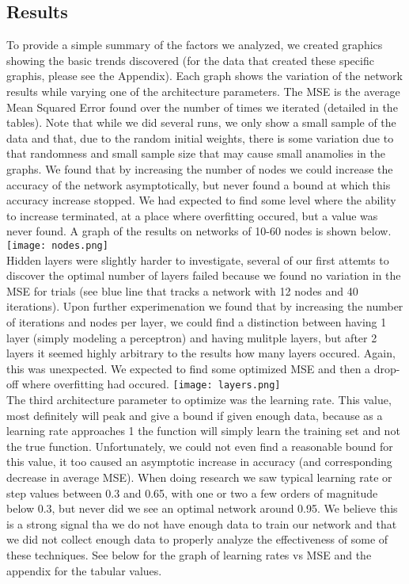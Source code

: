 \documentclass[a4paper,11pt]{article}
\begin{document}
\subsection{Results}
To provide a simple summary of the factors we analyzed, we created graphics showing the basic trends discovered (for the data that created these specific graphis, please see the Appendix). Each graph shows the variation of the network results while varying one of the architecture parameters. The MSE is the average Mean Squared Error found over the number of times we iterated (detailed in the tables). Note that while we did several runs, we only show a small sample of the data and that, due to the random initial weights, there is some variation due to that randomness and small sample size that may cause small anamolies in the graphs.  \newline
We found that by increasing the number of nodes we could increase the accuracy of the network asymptotically, but never found a bound at which this accuracy increase stopped. We had expected to find some level where the ability to increase terminated, at a place where overfitting occured, but a value was never found. A graph of the results on networks of 10-60 nodes is shown below. \newline
\texttt{[image: nodes.png]} \\
\newline
Hidden layers were slightly harder to investigate, several of our first attemts to discover the optimal number of layers failed because we found no variation in the MSE for trials (see blue line that tracks a network with 12 nodes and 40 iterations). Upon further experimenation we found that by increasing the number of iterations and nodes per layer, we could find a distinction between having 1 layer (simply modeling a perceptron) and having mulitple layers, but after 2 layers it seemed highly arbitrary to the results how many layers occured. Again, this was unexpected. We expected to find some optimized MSE and then a drop-off where overfitting had occured. \newline
\texttt{[image: layers.png]} \\
\newline
The third architecture parameter to optimize was the learning rate. This value, most definitely will peak and give a bound if given enough data, because as a learning rate approaches 1 the function will simply learn the training set and not the true function. Unfortunately, we could not even find a reasonable bound for this value, it too caused an asymptotic increase in accuracy (and corresponding decrease in average MSE). When doing research we saw typical learning rate or step values between 0.3 and 0.65, with one or two a few orders of magnitude below 0.3, but never did we see an optimal network around 0.95. We believe this is a strong signal tha we do not have enough data to train our network and that we did not collect enough data to properly analyze the effectiveness of some of these techniques. See below for the graph of learning rates vs MSE and the appendix for the tabular values. 
\end{document}
